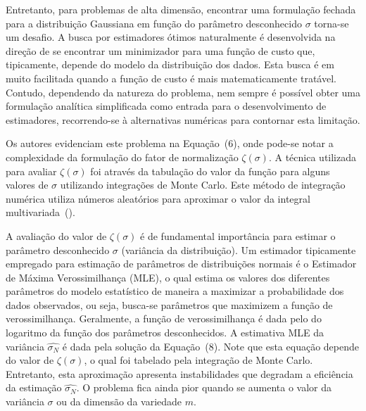 \documentclass[a4paper,titlepage]{article}
\begin{document}
Entretanto, para problemas de alta dimensão, encontrar uma formulação fechada
para a distribuição Gaussiana em função do parâmetro desconhecido $\sigma$
torna-se um desafio. A busca por estimadores ótimos naturalmente é desenvolvida
na direção de se encontrar um minimizador para uma função de custo que,
tipicamente, depende do modelo da distribuição dos dados\cite{kay}. Esta busca
é em muito facilitada quando a função de custo é mais matematicamente tratável.
Contudo, dependendo da natureza do problema, nem sempre é possível obter uma
formulação analítica simplificada como entrada para o desenvolvimento de
estimadores, recorrendo-se à alternativas numéricas para contornar esta
limitação.

Os autores evidenciam este problema na Equação~(6), onde pode-se notar
a complexidade da formulação do fator de normalização $\zeta(\sigma)$. A
técnica utilizada para avaliar $\zeta(\sigma)$ foi através da tabulação do
valor da função para alguns valores de $\sigma$ utilizando integrações de Monte
Carlo.  Este método de integração numérica utiliza números aleatórios para
aproximar o valor da integral multivariada~(\cite{caflisch1998monte}).

A avaliação do valor de $\zeta(\sigma)$ é de fundamental importância para
estimar o parâmetro desconhecido $\sigma$ (variância da distribuição).
 Um estimador tipicamente empregado para estimação de parâmetros
de distribuições normais é o Estimador de Máxima Verossimilhança (MLE), o qual
estima os valores dos diferentes parâmetros do modelo estatístico de maneira a
maximizar a probabilidade dos dados observados, ou seja, busca-se parâmetros
que maximizem a função de verossimilhança. Geralmente, a função de
verossimilhança é dada pelo do logaritmo da função dos parâmetros
desconhecidos. A estimativa MLE da variância $\hat{\sigma_N}$ é dada pela
solução da Equação~(8). Note que esta equação depende do valor de
$\zeta(\sigma)$, o qual foi tabelado pela integração de Monte Carlo.
Entretanto, esta aproximação apresenta instabilidades que degradam a eficiência
da estimação $\hat{\sigma_N}$. O problema fica ainda pior quando se aumenta o
valor da variância $\sigma$ ou da dimensão da variedade $m$.  

\begin{center}
  \vspace{1em}
  \vspace{1em}
\end{center}
\end{document}
